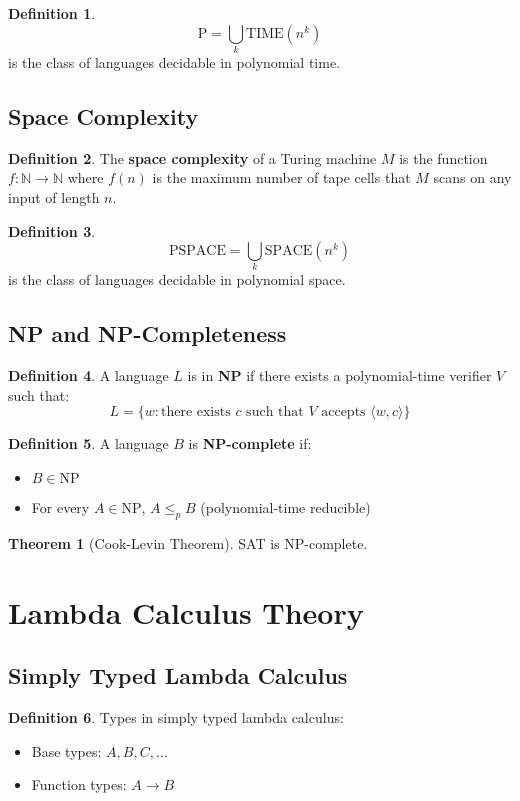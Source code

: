 \documentclass[11pt]{article}
\theoremstyle{definition}
\newtheorem{definition}{Definition}[section]
\newtheorem{theorem}{Theorem}[section]
\begin{document}
\begin{definition}
$$\text{P} = \bigcup_{k} \text{TIME}(n^k)$$
is the class of languages decidable in polynomial time.
\end{definition}

\subsection{Space Complexity}
\begin{definition}
The \textbf{space complexity} of a Turing machine $M$ is the function $f: \mathbb{N} \to \mathbb{N}$ where $f(n)$ is the maximum number of tape cells that $M$ scans on any input of length $n$.
\end{definition}

\begin{definition}
$$\text{PSPACE} = \bigcup_{k} \text{SPACE}(n^k)$$
is the class of languages decidable in polynomial space.
\end{definition}

\subsection{NP and NP-Completeness}
\begin{definition}
A language $L$ is in \textbf{NP} if there exists a polynomial-time verifier $V$ such that:
$$L = \{w : \text{there exists } c \text{ such that } V \text{ accepts } \langle w, c \rangle\}$$
\end{definition}

\begin{definition}
A language $B$ is \textbf{NP-complete} if:
\begin{itemize}
    \item $B \in \text{NP}$
    \item For every $A \in \text{NP}$, $A \leq_p B$ (polynomial-time reducible)
\end{itemize}
\end{definition}

\begin{theorem}[Cook-Levin Theorem]
SAT is NP-complete.
\end{theorem}

\section{Lambda Calculus Theory}

\subsection{Simply Typed Lambda Calculus}
\begin{definition}
Types in simply typed lambda calculus:
\begin{itemize}
    \item Base types: $A, B, C, \ldots$
    \item Function types: $A \to B$
\end{itemize}
\end{definition}
\end{document}
